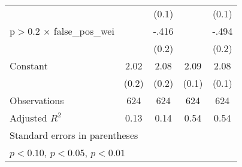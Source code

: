 \begin{table}[htbp]
\begin{tabular}{l*{4}{c}}
                &                  &    (0.1)         &                  &    (0.1)         \\
p$>$0.2 $\times$ false\_pos\_wei&                  &    -.416\sym{**} &                  &    -.494\sym{***}\\
                &                  &    (0.2)         &                  &    (0.2)         \\
Constant        &     2.02\sym{***}&     2.08\sym{***}&     2.09\sym{***}&     2.08\sym{***}\\
                &    (0.2)         &    (0.2)         &    (0.1)         &    (0.1)         \\
\hline
Observations    &      624         &      624         &      624         &      624         \\
Adjusted \(R^{2}\)&     0.13         &     0.14         &     0.54         &     0.54         \\
\hline\hline
\multicolumn{5}{l}{\footnotesize Standard errors in parentheses}\\
\multicolumn{5}{l}{\footnotesize \sym{*} \(p<0.10\), \sym{**} \(p<0.05\), \sym{***} \(p<0.01\)}\\
\end{tabular}
\end{table}
